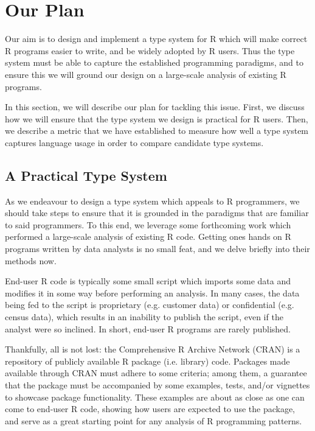 \documentclass[sigplan,10pt,review]{acmart}\settopmatter{printfolios=true,printccs=false,printacmref=false}
\begin{document}
%
%
%
%
\section{Our Plan}
\label{sec:plan}

Our aim is to design and implement a type system for R which will make correct R programs easier to write, and be widely adopted by R users.
Thus the type system must be able to capture the established programming paradigms, and to ensure this we will ground our design on a large-scale analysis of existing R programs.

In this section, we will describe our plan for tackling this issue.
First, we discuss how we will ensure that the type system we design is practical for R users.
Then, we describe a metric that we have established to measure how well a type system captures language usage in order to compare candidate type systems.

%
%
\subsection{A Practical Type System}
\label{sec:practicalTS}

As we endeavour to design a type system which appeals to R programmers, we should take steps to ensure that it is grounded in the paradigms that are familiar to said programmers.
To this end, we leverage some forthcoming work which performed a large-scale analysis of existing R code.
Getting ones hands on R programs written by data analysts is no small feat, and we delve briefly into their methods now.

End-user R code is typically some small script which imports some data and modifies it in some way before performing an analysis.
In many cases, the data being fed to the script is proprietary (e.g. customer data) or confidential (e.g. census data), which results in an inability to publish the script, even if the analyst were so inclined.
In short, end-user R programs are rarely published.

Thankfully, all is not lost: the Comprehensive R Archive Network (CRAN) is a repository of publicly available R package (i.e. library) code.
Packages made available through CRAN must adhere to some criteria; among them, a guarantee that the package must be accompanied by some examples, tests, and/or vignettes to showcase package functionality.
These examples are about as close as one can come to end-user R code, showing how users are expected to use the package, and serve as a great starting point for any analysis of R programming patterns.
\end{document}
